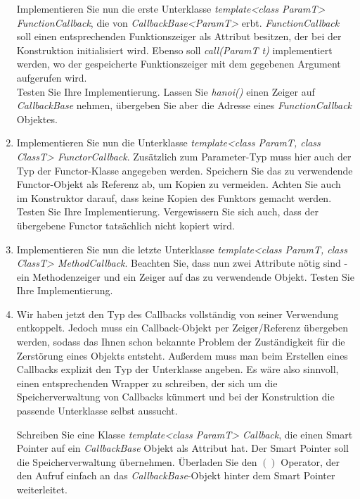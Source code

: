 \documentclass[
  accentcolor=tud1c,	%
  colorbacktitle,		%
  inverttitle,			%
  german,				%
  twoside
]{tudexercise}
\begin{document}
\begin{enumerate}
Implementieren Sie nun die erste Unterklasse \emph{template<class ParamT> FunctionCallback}, die von \emph{CallbackBase<ParamT>} erbt.  \emph{FunctionCallback} soll einen entsprechenden Funktionszeiger als Attribut besitzen, der bei der Konstruktion initialisiert wird. Ebenso soll \emph{call(ParamT t)} implementiert werden, wo der gespeicherte Funktionszeiger mit dem gegebenen Argument aufgerufen wird. \\

Testen Sie Ihre Implementierung. Lassen Sie \emph{hanoi()} einen Zeiger auf \emph{CallbackBase} nehmen, übergeben Sie aber die Adresse eines \emph{FunctionCallback} Objektes.

\item Implementieren Sie nun die Unterklasse \emph{template<class ParamT, class ClassT> FunctorCallback}. Zusätzlich zum Parameter-Typ muss hier auch der Typ der Functor-Klasse angegeben werden. Speichern Sie das zu verwendende Functor-Objekt als Referenz ab, um Kopien zu vermeiden. Achten Sie auch im Konstruktor darauf, dass keine Kopien des Funktors gemacht werden. Testen Sie Ihre Implementierung. Vergewissern Sie sich auch, dass der übergebene Functor tatsächlich nicht kopiert wird.

\item Implementieren Sie nun die letzte Unterklasse \emph{template<class ParamT, class ClassT> MethodCallback}. Beachten Sie, dass nun zwei Attribute nötig sind - ein Methodenzeiger und ein Zeiger auf das zu verwendende Objekt. Testen Sie Ihre Implementierung.

\item Wir haben jetzt den Typ des Callbacks vollständig von seiner Verwendung entkoppelt. Jedoch muss ein Callback-Objekt per Zeiger/Referenz übergeben werden, sodass das Ihnen schon bekannte  Problem der Zuständigkeit für die Zerstörung eines Objekts entsteht. Außerdem muss man beim Erstellen eines Callbacks explizit den Typ der Unterklasse angeben. Es wäre also sinnvoll, einen entsprechenden Wrapper zu schreiben, der sich um die Speicherverwaltung von Callbacks kümmert und bei der Konstruktion  die passende Unterklasse selbst aussucht.

Schreiben Sie eine Klasse \emph{template<class ParamT> Callback}, die einen Smart Pointer auf ein \emph{CallbackBase} Objekt als Attribut hat. Der Smart Pointer soll die Speicherverwaltung übernehmen. Überladen Sie den $()$ Operator, der den Aufruf einfach an das \emph{CallbackBase}-Objekt hinter dem Smart Pointer weiterleitet. \\


\end{enumerate}
\end{document}
